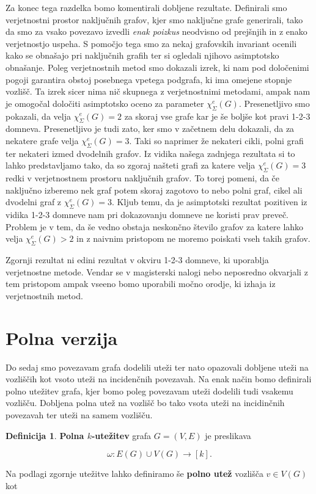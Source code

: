 \documentclass[12pt,a4paper,twoside]{article}
\theoremstyle{definition} %
\newtheorem{definicija}{Definicija}[section]
\theoremstyle{plain} %
\newcommand{\ec}{\chi_{\Sigma}^e}
\numberwithin{equation}{section}  %
\begin{document}
Za konec tega razdelka bomo komentirali dobljene rezultate. Definirali smo verjetnostni prostor naključnih grafov, kjer smo naključne grafe generirali, tako da smo za vsako povezavo izvedli \textit{enak poizkus} neodvisno od prejšnjih in z enako verjetnostjo uspeha. S pomočjo tega smo za nekaj grafovskih invariant ocenili kako se obnašajo pri naključnih grafih ter si ogledali njihovo asimptotsko obnašanje. Poleg verjetnostnih metod smo dokazali izrek, ki nam pod določenimi pogoji garantira obstoj posebnega vpetega podgrafa, ki ima omejene stopnje vozlišč. Ta izrek sicer nima nič skupnega z verjetnostnimi metodami, ampak nam je omogočal določiti asimptotsko oceno za parameter $\ec(G)$. Presenetljivo smo pokazali, da velja $\ec(G) = 2$ za skoraj vse grafe kar je še boljše kot pravi 1-2-3 domneva. Presenetljivo je tudi zato, ker smo v začetnem delu dokazali, da za nekatere grafe velja $\ec(G) = 3$. Taki so naprimer že nekateri cikli, polni grafi ter nekateri izmed dvodelnih grafov. Iz vidika našega zadnjega rezultata si to lahko predstavljamo tako, da so zgoraj našteti grafi za katere velja $\ec(G) = 3$ redki v verjetnostnem prostoru naključnih grafov. To torej pomeni, da če naključno izberemo nek graf potem skoraj zagotovo to nebo polni graf, cikel ali dvodelni graf z $\ec(G) = 3$. Kljub temu, da je asimptotski rezultat pozitiven iz vidika 1-2-3 domneve nam pri dokazovanju domneve ne koristi prav preveč. Problem je v tem, da še vedno obstaja neskončno število grafov za katere lahko velja $\ec(G) > 2$ in z naivnim pristopom ne moremo poiskati vseh takih grafov.

Zgornji rezultat ni edini rezultat v okviru 1-2-3 domneve, ki uporablja verjetnostne metode. Vendar se v magisterski nalogi nebo neposredno okvarjali z tem pristopom ampak vseeno bomo uporabili močno orodje, ki izhaja iz verjetnostnih metod.

\section{Polna verzija}

Do sedaj smo povezavam grafa dodelili uteži ter nato opazovali dobljene uteži na vozliščih kot vsoto uteži na incidenčnih povezavah. Na enak način bomo definirali polno utežitev grafa, kjer bomo poleg povezavam uteži dodelili tudi vsakemu vozlišču. Dobljena polna utež na vozlišč bo tako vsota uteži na incidinčnih povezavah  ter uteži na samem vozlišču.

\begin{definicija}
\textbf{Polna $k$-utežitev} grafa $G=(V,E)$ je preslikava

$$ \omega : E(G) \cup V(G) \rightarrow [k]. $$
\end{definicija}
Na podlagi zgornje utežitve lahko definiramo še \textbf{polno utež} vozlišča $v \in V(G)$ kot
\end{document}
